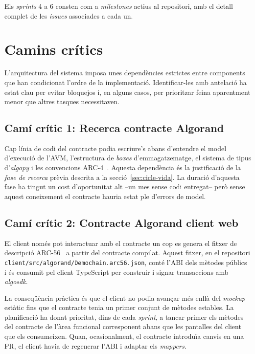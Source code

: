 Els \emph{sprints} 4 a 6 consten com a \emph{milestones} actius al repositori, amb el detall complet de les
\emph{issues} associades a cada un.



\section{Camins crítics}
\label{sec:camins-critics}

L'arquitectura del sistema imposa unes dependències estrictes entre components que han condicionat l'ordre de la
implementació.
Identificar-les amb antelació ha estat clau per evitar bloquejos i, en alguns casos, per prioritzar feina aparentment
menor que altres tasques necessitaven.

\subsection{Camí crític 1: Recerca \textrightarrow{} contracte Algorand}
\label{subsec:cami-critic-1:-recerca-contracte-algorand}

Cap línia de codi del contracte podia escriure's abans d'entendre el model d'execució de l'\ac{AVM}, l'estructura de
\emph{boxes} d'emmagatzematge, el sistema de tipus d'\emph{algopy} i les convencions
\ac{ARC}-4~\cite{algorandfoundation2023arc4}.
Aquesta dependència és la justificació de la \emph{fase de recerca} prèvia descrita a la secció~\ref{sec:cicle-vida}.
La duració d'aquesta fase ha tingut un cost d'oportunitat alt --un mes sense codi entregat-- però sense aquest
coneixement el contracte hauria estat ple d'errors de model.

\subsection{Camí crític 2: Contracte Algorand \textrightarrow{} client web}
\label{subsec:cami-critic-2:-contracte-algorand-client-web}

El client només pot interactuar amb el contracte un cop es genera el fitxer de descripció
\ac{ARC}-56~\cite{algorandfoundation2023arc56} a partir del contracte compilat.
Aquest fitxer, en el repositori \texttt{client/src/algorand/Demochain.arc56.json}, conté l'\ac{ABI} dels mètodes públics
i és consumit pel client TypeScript per construir i signar transaccions amb \emph{algosdk}.

La conseqüència pràctica és que el client no podia avançar més enllà del \emph{mockup} estàtic fins que el contracte
tenia un primer conjunt de mètodes estables.
La planificació ha donat prioritat, dins de cada \emph{sprint}, a tancar primer els mètodes del contracte de l'àrea
funcional corresponent abans que les pantalles del client que els consumeixen.
Quan, ocasionalment, el contracte introduïa canvis en una \ac{PR}, el client havia de regenerar l'\ac{ABI} i adaptar els
\emph{mappers}.


